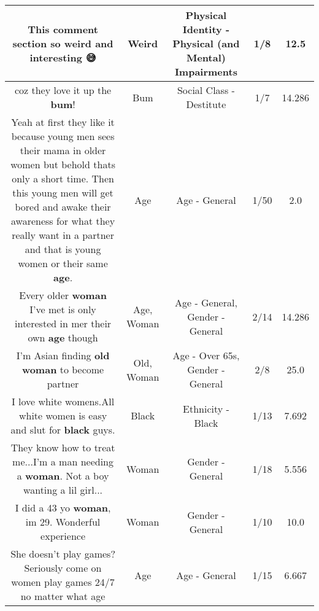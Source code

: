 \documentclass[11pt]{article}
\newlength\mylength
\begin{document}
\begin{center}
\begin{longtable}{|C{.65\mylength}|C{.30\mylength}|C{.12\mylength}|C{.12\mylength}|C{.12\mylength}|}
  \small This comment section so \textbf{weird} and interesting 😅\normalsize   & Weird & Physical Identity - Physical (and Mental) Impairments & 1/8 & 12.5 \\  \hline
  \small coz they love it up the \textbf{bum}!\normalsize   & Bum & Social Class - Destitute & 1/7 & 14.286 \\  \hline
  \small Yeah at first they like it because young men sees their mama in older women but behold thats only a short time. Then this young men will get bored and awake their awareness for what they really want in a partner and that is young women or their same \textbf{age}.\normalsize   & Age & Age - General & 1/50 & 2.0 \\  \hline
  \small Every older \textbf{woman} I've met is only interested in mer their own \textbf{age} though\normalsize   & Age, Woman & Age - General, Gender - General & 2/14 & 14.286 \\  \hline
  \small I'm Asian finding \textbf{old} \textbf{woman} to become partner\normalsize   & Old, Woman & Age - Over 65s, Gender - General & 2/8 & 25.0 \\  \hline
  \small I love white womens.All white women is easy and slut for \textbf{black} guys.\normalsize   & Black & Ethnicity - Black & 1/13 & 7.692 \\  \hline
  \small They know how to treat me...I'm a man needing a \textbf{woman}. Not a boy wanting a lil girl...\normalsize   & Woman & Gender - General & 1/18 & 5.556 \\  \hline
  \small I did a 43 yo \textbf{woman}, im 29. Wonderful experience\normalsize   & Woman & Gender - General & 1/10 & 10.0 \\  \hline
  \small She doesn't play games? Seriously come on women play games 24/7 no matter what age\normalsize   & Age & Age - General & 1/15 & 6.667 \\  \hline

\end{longtable}
\end{center}
\end{document}
